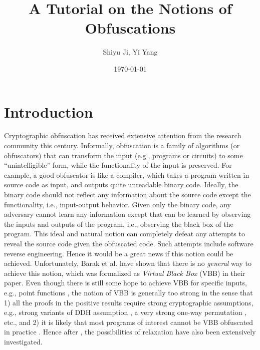 \documentclass[12pt]{article}
\newcommand{\heading}[5]{
   \renewcommand{\thepage}{#1-\arabic{page}}
   \noindent
   \begin{center}
   \framebox[\textwidth]{
     \begin{minipage}{0.9\textwidth} \onehalfspacing
       {\bf CS 290G -- Introduction to Modern Cryptography} \hfill #2

       {\centering \Large #5
       
       }\medskip

       {\it #3 \hfill #4}
     \end{minipage}
   }
   \end{center}
}
\newcommand{\handout}[3]{\heading{#1}{#2}{Instructor:
Stefano Tessaro}{Student: Shiyu Ji, Yi Yang}{A Tutorial on the Notions of Obfuscations}}
\theoremstyle{definition}
\begin{document}
\title{A Tutorial on the Notions of Obfuscations}
\author{Shiyu Ji, Yi Yang}
\date{\today}
\maketitle

\section{Introduction}
Cryptographic obfuscation has received extensive attention from the research community this century. Informally, obfuscation is a family of algorithms (or obfuscators) that can transform the input (e.g., programs or circuits) to some ``unintelligible'' form, while the functionality of the input is preserved. For example, a good obfuscator is like a compiler, which takes a program written in source code as input, and outputs quite unreadable binary code. Ideally, the binary code should not reflect any information about the source code except the functionality, i.e., input-output behavior. Given only the binary code, any adversary cannot learn any information except that can be learned by observing the inputs and outputs of the program, i.e., observing the black box of the program. This ideal and natural notion can completely defeat any attempts to reveal the source code given the obfuscated code. Such attempts include software reverse engineering. Hence it would be a great news if this notion could be achieved. Unfortunately, Barak et al. \cite{barak2001possibility,barak2012possibility} have shown that there is no \emph{general} way to achieve this notion, which was formalized as \emph{Virtual Black Box} (VBB) in their paper. Even though there is still some hope to achieve VBB for specific inputs, e.g., point functions \cite{canetti1997towards, canetti1998perfectly, wee2005obfuscating}, the notion of VBB is generally too strong in the sense that 1) all the proofs in the positive results require strong cryptographic assumptions, e.g., strong variants of DDH assumption \cite{canetti1997towards,canetti1998perfectly}, a very strong one-way permutation \cite{wee2005obfuscating}, etc., and 2) it is likely that most programs of interest cannot be VBB obfuscated in practice \cite{goldwasser2005impossibility}. Hence after \cite{barak2001possibility}, the possibilities of relaxation have also been extensively investigated.
\end{document}
